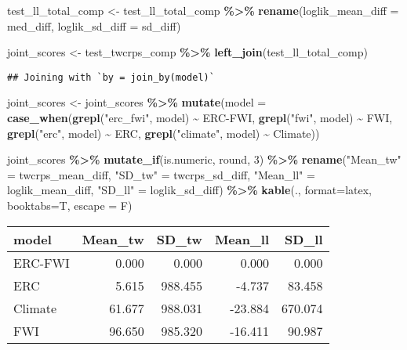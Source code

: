 \documentclass[
]{article}
\newenvironment{Shaded}{\begin{snugshade}}{\end{snugshade}}
\newcommand{\AttributeTok}[1]{\textcolor[rgb]{0.13,0.29,0.53}{#1}}
\newcommand{\DecValTok}[1]{\textcolor[rgb]{0.00,0.00,0.81}{#1}}
\newcommand{\FunctionTok}[1]{\textcolor[rgb]{0.13,0.29,0.53}{\textbf{#1}}}
\newcommand{\NormalTok}[1]{#1}
\newcommand{\OtherTok}[1]{\textcolor[rgb]{0.56,0.35,0.01}{#1}}
\newcommand{\SpecialCharTok}[1]{\textcolor[rgb]{0.81,0.36,0.00}{\textbf{#1}}}
\newcommand{\StringTok}[1]{\textcolor[rgb]{0.31,0.60,0.02}{#1}}
\begin{document}
\begin{Shaded}
\begin{Highlighting}[]
\NormalTok{test\_ll\_total\_comp }\OtherTok{\textless{}{-}}\NormalTok{ test\_ll\_total\_comp }\SpecialCharTok{\%\textgreater{}\%} \FunctionTok{rename}\NormalTok{(}\AttributeTok{loglik\_mean\_diff =}\NormalTok{ med\_diff, }\AttributeTok{loglik\_sd\_diff =}\NormalTok{ sd\_diff)}

\NormalTok{joint\_scores }\OtherTok{\textless{}{-}}\NormalTok{ test\_twcrps\_comp }\SpecialCharTok{\%\textgreater{}\%} \FunctionTok{left\_join}\NormalTok{(test\_ll\_total\_comp)}
\end{Highlighting}
\end{Shaded}

\begin{verbatim}
## Joining with `by = join_by(model)`
\end{verbatim}

\begin{Shaded}
\begin{Highlighting}[]
\NormalTok{joint\_scores }\OtherTok{\textless{}{-}}\NormalTok{ joint\_scores }\SpecialCharTok{\%\textgreater{}\%} 
  \FunctionTok{mutate}\NormalTok{(}\AttributeTok{model =} \FunctionTok{case\_when}\NormalTok{(}\FunctionTok{grepl}\NormalTok{(}\StringTok{"erc\_fwi"}\NormalTok{, model) }\SpecialCharTok{\textasciitilde{}} \StringTok{\textquotesingle{}ERC{-}FWI\textquotesingle{}}\NormalTok{,}
                           \FunctionTok{grepl}\NormalTok{(}\StringTok{"fwi"}\NormalTok{, model) }\SpecialCharTok{\textasciitilde{}} \StringTok{\textquotesingle{}FWI\textquotesingle{}}\NormalTok{,}
                           \FunctionTok{grepl}\NormalTok{(}\StringTok{"erc"}\NormalTok{, model) }\SpecialCharTok{\textasciitilde{}} \StringTok{\textquotesingle{}ERC\textquotesingle{}}\NormalTok{,}
                           \FunctionTok{grepl}\NormalTok{(}\StringTok{"climate"}\NormalTok{, model) }\SpecialCharTok{\textasciitilde{}} \StringTok{\textquotesingle{}Climate\textquotesingle{}}\NormalTok{))}

\NormalTok{joint\_scores }\SpecialCharTok{\%\textgreater{}\%} \FunctionTok{mutate\_if}\NormalTok{(is.numeric, round, }\DecValTok{3}\NormalTok{) }\SpecialCharTok{\%\textgreater{}\%} \FunctionTok{rename}\NormalTok{(}\StringTok{"Mean\_tw"} \OtherTok{=}\NormalTok{ twcrps\_mean\_diff, }\StringTok{"SD\_tw"} \OtherTok{=}\NormalTok{ twcrps\_sd\_diff, }\StringTok{"Mean\_ll"} \OtherTok{=}\NormalTok{ loglik\_mean\_diff, }\StringTok{"SD\_ll"} \OtherTok{=}\NormalTok{ loglik\_sd\_diff) }\SpecialCharTok{\%\textgreater{}\%}
  \FunctionTok{kable}\NormalTok{(., }\AttributeTok{format=}\StringTok{\textquotesingle{}latex\textquotesingle{}}\NormalTok{, }\AttributeTok{booktabs=}\NormalTok{T, }\AttributeTok{escape =}\NormalTok{ F)}
\end{Highlighting}
\end{Shaded}

\begin{tabular}{lrrrr}
\toprule
model & Mean_tw & SD_tw & Mean_ll & SD_ll\\
\midrule
ERC-FWI & 0.000 & 0.000 & 0.000 & 0.000\\
ERC & 5.615 & 988.455 & -4.737 & 83.458\\
Climate & 61.677 & 988.031 & -23.884 & 670.074\\
FWI & 96.650 & 985.320 & -16.411 & 90.987\\
\bottomrule
\end{tabular}
\end{document}
